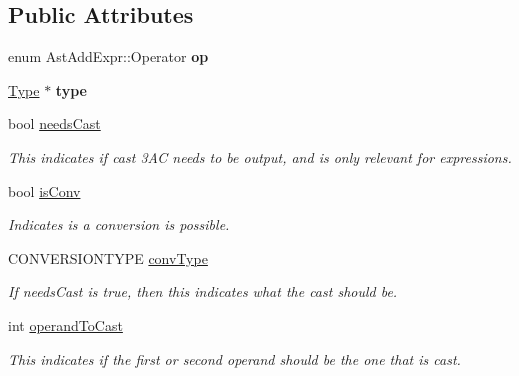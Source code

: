 \subsection*{Public Attributes}
\begin{DoxyCompactItemize}
\item 
\hypertarget{classAstAddExpr_aee8f2b17dced22a50fe3088795a698a6}{enum Ast\-Add\-Expr\-::\-Operator {\bfseries op}}\label{classAstAddExpr_aee8f2b17dced22a50fe3088795a698a6}

\item 
\hypertarget{classAstAddExpr_a2076082ac8b4b10910969890379f33c1}{\hyperlink{classType}{Type} $\ast$ {\bfseries type}}\label{classAstAddExpr_a2076082ac8b4b10910969890379f33c1}

\item 
\hypertarget{classAST_aaf215802de409f8096c063d01ffa6783}{bool \hyperlink{classAST_aaf215802de409f8096c063d01ffa6783}{needs\-Cast}}\label{classAST_aaf215802de409f8096c063d01ffa6783}

\begin{DoxyCompactList}\small\item\em This indicates if cast 3\-A\-C needs to be output, and is only relevant for expressions. \end{DoxyCompactList}\item 
\hypertarget{classAST_afa9e77ef650ec6664458fa6cb55be985}{bool \hyperlink{classAST_afa9e77ef650ec6664458fa6cb55be985}{is\-Conv}}\label{classAST_afa9e77ef650ec6664458fa6cb55be985}

\begin{DoxyCompactList}\small\item\em Indicates is a conversion is possible. \end{DoxyCompactList}\item 
\hypertarget{classAST_a61ef3317e023d45237e06615b387cd6b}{C\-O\-N\-V\-E\-R\-S\-I\-O\-N\-T\-Y\-P\-E \hyperlink{classAST_a61ef3317e023d45237e06615b387cd6b}{conv\-Type}}\label{classAST_a61ef3317e023d45237e06615b387cd6b}

\begin{DoxyCompactList}\small\item\em If needs\-Cast is true, then this indicates what the cast should be. \end{DoxyCompactList}\item 
\hypertarget{classAST_aea9b07b39d24183f38c0029cec0a878e}{int \hyperlink{classAST_aea9b07b39d24183f38c0029cec0a878e}{operand\-To\-Cast}}\label{classAST_aea9b07b39d24183f38c0029cec0a878e}

\begin{DoxyCompactList}\small\item\em This indicates if the first or second operand should be the one that is cast. \end{DoxyCompactList}\end{DoxyCompactItemize}

